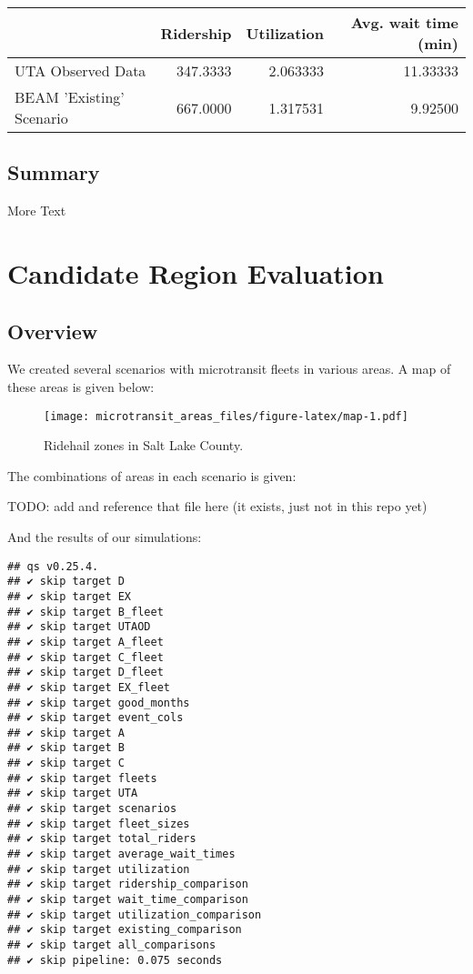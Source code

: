 \documentclass[
]{article}
\begin{document}
\begin{table}
\centering
\begin{tabular}[t]{lrrr}
\toprule
  & Ridership & Utilization & Avg. wait time (min)\\
\midrule
UTA Observed Data & 347.3333 & 2.063333 & 11.33333\\
BEAM 'Existing' Scenario & 667.0000 & 1.317531 & 9.92500\\
\bottomrule
\end{tabular}
\end{table}

\hypertarget{summary-2}{%
\subsection{Summary}\label{summary-2}}

More Text

\hypertarget{candidate-region-evaluation}{%
\section{Candidate Region Evaluation}\label{candidate-region-evaluation}}

\hypertarget{overview-3}{%
\subsection{Overview}\label{overview-3}}

We created several scenarios with microtransit fleets in various areas. A map of these areas is given below:

\begin{figure}
\centering
\texttt{[image: microtransit\_areas\_files/figure-latex/map-1.pdf]}
\caption{\label{fig:map}Ridehail zones in Salt Lake County.}
\end{figure}

The combinations of areas in each scenario is given:

TODO: add and reference that file here (it exists, just not in this repo yet)

And the results of our simulations:

\begin{verbatim}
## qs v0.25.4.
## ✔ skip target D
## ✔ skip target EX
## ✔ skip target B_fleet
## ✔ skip target UTAOD
## ✔ skip target A_fleet
## ✔ skip target C_fleet
## ✔ skip target D_fleet
## ✔ skip target EX_fleet
## ✔ skip target good_months
## ✔ skip target event_cols
## ✔ skip target A
## ✔ skip target B
## ✔ skip target C
## ✔ skip target fleets
## ✔ skip target UTA
## ✔ skip target scenarios
## ✔ skip target fleet_sizes
## ✔ skip target total_riders
## ✔ skip target average_wait_times
## ✔ skip target utilization
## ✔ skip target ridership_comparison
## ✔ skip target wait_time_comparison
## ✔ skip target utilization_comparison
## ✔ skip target existing_comparison
## ✔ skip target all_comparisons
## ✔ skip pipeline: 0.075 seconds
\end{verbatim}
\end{document}
